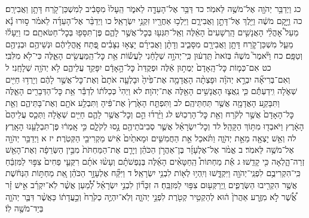 \documentclass[twoside, openany, parskip=half, 11pt]{book}
\begin{document}
כג וַיְדַבֵּ֥ר יְהֹוָ֖ה אֶל־מֹשֶׁ֥ה לֵּאמֹֽר׃ כד דַּבֵּ֥ר אֶל־הָעֵדָ֖ה לֵאמֹ֑ר הֵֽעָלוּ֙ מִסָּבִ֔יב לְמִשְׁכַּן־קֹ֖רַח דָּתָ֥ן וַאֲבִירָֽם׃ כה וַיָּ֣קׇם מֹשֶׁ֔ה וַיֵּ֖לֶךְ אֶל־דָּתָ֣ן וַאֲבִירָ֑ם וַיֵּלְכ֥וּ אַחֲרָ֖יו זִקְנֵ֥י יִשְׂרָאֵֽל׃ כו וַיְדַבֵּ֨ר אֶל־הָעֵדָ֜ה לֵאמֹ֗ר ס֣וּרוּ נָ֡א מֵעַל֩ אׇהֳלֵ֨י הָאֲנָשִׁ֤ים הָֽרְשָׁעִים֙ הָאֵ֔לֶּה וְאַֽל־תִּגְּע֖וּ בְּכׇל־אֲשֶׁ֣ר לָהֶ֑ם פֶּן־תִּסָּפ֖וּ בְּכׇל־חַטֹּאתָֽם׃ כז וַיֵּעָל֗וּ מֵעַ֧ל מִשְׁכַּן־קֹ֛רַח דָּתָ֥ן וַאֲבִירָ֖ם מִסָּבִ֑יב וְדָתָ֨ן וַאֲבִירָ֜ם יָצְא֣וּ נִצָּבִ֗ים פֶּ֚תַח אׇֽהֳלֵיהֶ֔ם וּנְשֵׁיהֶ֥ם וּבְנֵיהֶ֖ם וְטַפָּֽם׃ כח וַיֹּ֘אמֶר֮ מֹשֶׁה֒ בְּזֹאת֙ תֵּֽדְע֔וּן כִּֽי־יְהֹוָ֣ה שְׁלָחַ֔נִי לַעֲשׂ֕וֹת אֵ֥ת כׇּל־הַֽמַּעֲשִׂ֖ים הָאֵ֑לֶּה כִּי־לֹ֖א מִלִּבִּֽי׃ כט אִם־כְּמ֤וֹת כׇּל־הָֽאָדָם֙ יְמֻת֣וּן אֵ֔לֶּה וּפְקֻדַּת֙ כׇּל־הָ֣אָדָ֔ם יִפָּקֵ֖ד עֲלֵיהֶ֑ם לֹ֥א יְהֹוָ֖ה שְׁלָחָֽנִי׃ ל וְאִם־בְּרִיאָ֞ה יִבְרָ֣א יְהֹוָ֗ה וּפָצְתָ֨ה הָאֲדָמָ֤ה אֶת־פִּ֙יהָ֙ וּבָלְעָ֤ה אֹתָם֙ וְאֶת־כׇּל־אֲשֶׁ֣ר לָהֶ֔ם וְיָרְד֥וּ חַיִּ֖ים שְׁאֹ֑לָה וִֽידַעְתֶּ֕ם כִּ֧י נִֽאֲצ֛וּ הָאֲנָשִׁ֥ים הָאֵ֖לֶּה אֶת־יְהֹוָה׃ לא וַיְהִי֙ כְּכַלֹּת֔וֹ לְדַבֵּ֕ר אֵ֥ת כׇּל־הַדְּבָרִ֖ים הָאֵ֑לֶּה וַתִּבָּקַ֥ע הָאֲדָמָ֖ה אֲשֶׁ֥ר תַּחְתֵּיהֶֽם׃ לב וַתִּפְתַּ֤ח הָאָ֙רֶץ֙ אֶת־פִּ֔יהָ וַתִּבְלַ֥ע אֹתָ֖ם וְאֶת־בָּתֵּיהֶ֑ם וְאֵ֤ת כׇּל־הָאָדָם֙ אֲשֶׁ֣ר לְקֹ֔רַח וְאֵ֖ת כׇּל־הָרְכֽוּשׁ׃ לג וַיֵּ֨רְד֜וּ הֵ֣ם וְכׇל־אֲשֶׁ֥ר לָהֶ֛ם חַיִּ֖ים שְׁאֹ֑לָה וַתְּכַ֤ס עֲלֵיהֶם֙ הָאָ֔רֶץ וַיֹּאבְד֖וּ מִתּ֥וֹךְ הַקָּהָֽל׃ לד וְכׇל־יִשְׂרָאֵ֗ל אֲשֶׁ֛ר סְבִיבֹתֵיהֶ֖ם נָ֣סוּ לְקֹלָ֑ם כִּ֣י אָֽמְר֔וּ פֶּן־תִּבְלָעֵ֖נוּ הָאָֽרֶץ׃ לה וְאֵ֥שׁ יָצְאָ֖ה מֵאֵ֣ת יְהֹוָ֑ה וַתֹּ֗אכַל אֵ֣ת הַחֲמִשִּׁ֤ים וּמָאתַ֙יִם֙ אִ֔ישׁ מַקְרִיבֵ֖י הַקְּטֹֽרֶת׃
יז א וַיְדַבֵּ֥ר יְהֹוָ֖ה אֶל־מֹשֶׁ֥ה לֵּאמֹֽר׃ ב אֱמֹ֨ר אֶל־אֶלְעָזָ֜ר בֶּן־אַהֲרֹ֣ן הַכֹּהֵ֗ן וְיָרֵ֤ם אֶת־הַמַּחְתֹּת֙ מִבֵּ֣ין הַשְּׂרֵפָ֔ה וְאֶת־הָאֵ֖שׁ זְרֵה־הָ֑לְאָה כִּ֖י קָדֵֽשׁוּ׃ ג אֵ֡ת מַחְתּוֹת֩ הַֽחַטָּאִ֨ים הָאֵ֜לֶּה בְּנַפְשֹׁתָ֗ם וְעָשׂ֨וּ אֹתָ֜ם רִקֻּעֵ֤י פַחִים֙ צִפּ֣וּי לַמִּזְבֵּ֔חַ כִּֽי־הִקְרִיבֻ֥ם לִפְנֵֽי־יְהֹוָ֖ה וַיִּקְדָּ֑שׁוּ וְיִֽהְי֥וּ לְא֖וֹת לִבְנֵ֥י יִשְׂרָאֵֽל׃ ד וַיִּקַּ֞ח אֶלְעָזָ֣ר הַכֹּהֵ֗ן אֵ֚ת מַחְתּ֣וֹת הַנְּחֹ֔שֶׁת אֲשֶׁ֥ר הִקְרִ֖יבוּ הַשְּׂרֻפִ֑ים וַֽיְרַקְּע֖וּם צִפּ֥וּי לַמִּזְבֵּֽחַ׃ ה זִכָּר֞וֹן לִבְנֵ֣י יִשְׂרָאֵ֗ל לְ֠מַ֠עַן אֲשֶׁ֨ר לֹֽא־יִקְרַ֜ב אִ֣ישׁ זָ֗ר אֲ֠שֶׁ֠ר לֹ֣א מִזֶּ֤רַע אַהֲרֹן֙ ה֔וּא לְהַקְטִ֥יר קְטֹ֖רֶת לִפְנֵ֣י יְהֹוָ֑ה וְלֹֽא־יִהְיֶ֤ה כְקֹ֙רַח֙ וְכַ֣עֲדָת֔וֹ כַּאֲשֶׁ֨ר דִּבֶּ֧ר יְהֹוָ֛ה בְּיַד־מֹשֶׁ֖ה לֽוֹ׃
\end{document}
